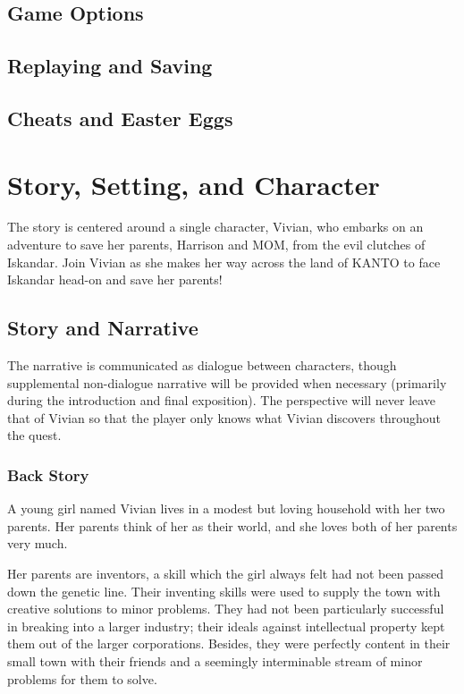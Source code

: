 \documentclass[12pt,titlepage]{article}
\newcommand\protagonist{Vivian\xspace}
\newcommand\dad{Harrison\xspace}
\newcommand\mom{MOM\xspace}
\newcommand\evilcorp{Iskandar\xspace}
\newcommand\world{KANTO\xspace}
\begin{document}
\subsection{Game Options}

\subsection{Replaying and Saving}

\subsection{Cheats and Easter Eggs}

\newpage
\section{Story, Setting, and Character}

The story is centered around a single character, \protagonist, who embarks on an
adventure to save her parents, \dad and \mom, from the evil clutches of
\evilcorp. Join \protagonist as she makes her way across the land of \world to
face \evilcorp head-on and save her parents!

\subsection{Story and Narrative}

The narrative is communicated as dialogue between characters, though
supplemental non-dialogue narrative will be provided when necessary (primarily
during the introduction and final exposition). The perspective will never leave
that of \protagonist so that the player only knows what \protagonist discovers
throughout the quest.

\subsubsection{Back Story}

A young girl named Vivian lives in a modest but loving household with her two
parents. Her parents think of her as their world, and she loves both of her
parents very much.

Her parents are inventors, a skill which the girl always felt had not been
passed down the genetic line. Their inventing skills were used to supply the
town with creative solutions to minor problems. They had not been particularly
successful in breaking into a larger industry; their ideals against intellectual
property kept them out of the larger corporations. Besides, they were perfectly
content in their small town with their friends and a seemingly interminable
stream of minor problems for them to solve.
\end{document}
